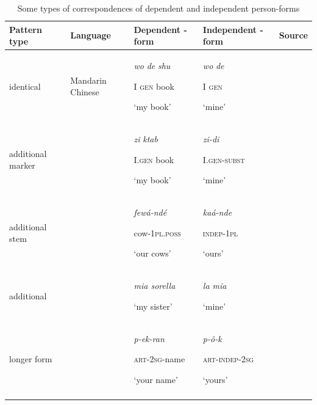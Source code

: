 \documentclass[output=paper]{langsci/langscibook}
\begin{document}
\begin{table}
\small
\begin{tabularx}{\textwidth}{Qp{2cm}XXp{2cm}}
\lsptoprule

\bfseries Pattern type & \bfseries Language & \bfseries Dependent -form & \bfseries Independent -form & \bfseries Source\\
\midrule
identical & Mandarin  Chinese & \textit{wo}   \textit{de}  \textit{shu}


I   \textsc{gen}  book

‘my book’ & \textit{wo}  \textit{de~}

I  \textsc{gen}

‘mine’ & \\
\tablevspace

additional marker &  & \textit{zi}  \textit{ktab}

I.\textsc{gen}  book

‘my book’ & \textit{zi-di}

I.\textsc{gen-subst}

‘mine’ & \citet[110]{Haspelmath1993}\\

\tablevspace
additional stem &  & \textit{fewá-ndé}

cow-\textsc{1pl.poss}

‘our cows’ & \textit{kaá{}-nde}

\textsc{indep-1pl}

‘ours’ & \citet[31f.]{Cyffer1998_Kanuri}\\


\tablevspace
additional ~ &  & \textit{mia sorella}

‘my sister’ & \textit{la mia}

‘mine’ & \citet[44,286f.]{Schwarze1988}\\


\tablevspace
longer form &  & \textit{p-ek-ran}

\textsc{art-2sg}{}-name

‘your name’ & \textit{p-ô}\textit{{}-k}

\textsc{art-indep-2sg}

‘yours’ & \citet[277]{Haspelmath2015}\\
\lspbottomrule
\end{tabularx}

\caption{Some types of correspondences of dependent and independent per\-son-forms}
\label{tab:michaelis:1}
\end{table}
\end{document}
